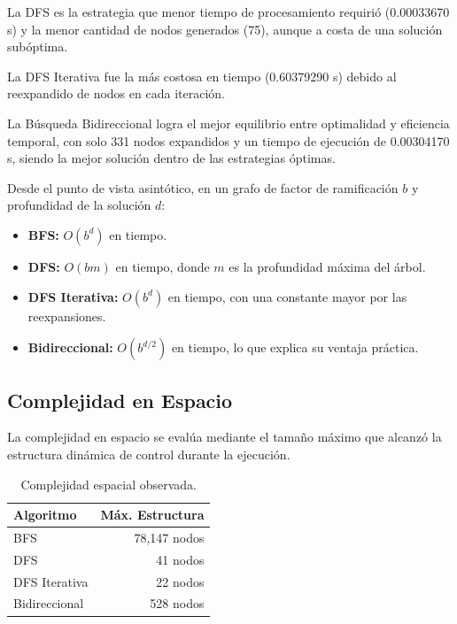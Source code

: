 \documentclass{article}
\begin{document}
La DFS es la estrategia que menor tiempo de procesamiento requirió
(0.00033670 s) y la menor cantidad de nodos generados (75), aunque
a costa de una solución subóptima.

La DFS Iterativa fue la más costosa en tiempo (0.60379290 s) debido
al reexpandido de nodos en cada iteración.

La Búsqueda Bidireccional logra el mejor equilibrio entre optimalidad
y eficiencia temporal, con solo 331 nodos expandidos y un tiempo de
ejecución de 0.00304170 s, siendo la mejor solución dentro de las
estrategias óptimas.

Desde el punto de vista asintótico, en un grafo de factor de
ramificación $b$ y profundidad de la solución $d$:

\begin{itemize}

    \item \textbf{BFS:} $O(b^d)$ en tiempo.

    \item \textbf{DFS:} $O(bm)$ en tiempo, donde $m$ es la profundidad
    máxima del árbol.

    \item \textbf{DFS Iterativa:} $O(b^d)$ en tiempo, con una
    constante mayor por las reexpansiones.

    \item \textbf{Bidireccional:} $O(b^{d/2})$ en tiempo, lo que
    explica su ventaja práctica.

\end{itemize}

\subsection{Complejidad en Espacio}

La complejidad en espacio se evalúa mediante el tamaño máximo que
alcanzó la estructura dinámica de control durante la ejecución.

\begin{table}[H]
\centering

\begin{tabular}{|l|r|}
\hline

\textbf{Algoritmo} &
\textbf{Máx. Estructura}
\\ \hline

BFS &
78,147 nodos
\\ \hline

DFS &
41 nodos
\\ \hline

DFS Iterativa &
22 nodos
\\ \hline

Bidireccional &
528 nodos
\\ \hline

\end{tabular}

\caption{Complejidad espacial observada.}

\end{table}
\end{document}
